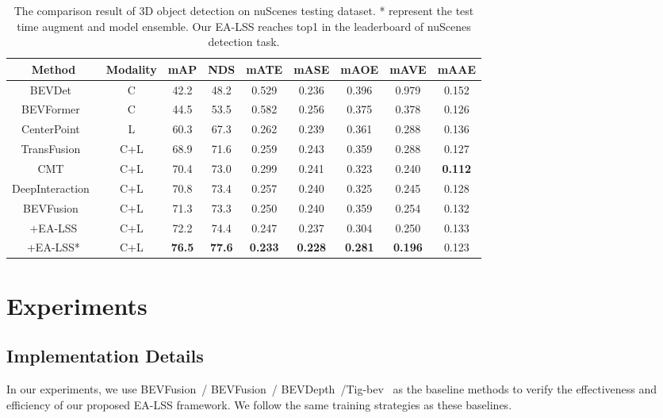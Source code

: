 \documentclass[letterpaper]{article} \usepackage[submission]{aaai24}  \usepackage{times}  \usepackage{helvet}  \usepackage{courier}  \usepackage[hyphens]{url}  \usepackage{graphicx} \urlstyle{rm} \def\UrlFont{\rm}  \usepackage{natbib}  \usepackage{caption} \frenchspacing  \setlength{\pdfpagewidth}{8.5in} \setlength{\pdfpageheight}{11in} \usepackage{algorithm}
\begin{document}
\begin{table*}
\begin{center}
\small
\begin{tabular}{c|c|cc|ccccc}
\hline
Method & Modality & mAP  & NDS & mATE & mASE & mAOE & mAVE & mAAE \\
\hline
BEVDet~\cite{huang2021bevdet} & C &  42.2  & 48.2 & 0.529&0.236&0.396&0.979&0.152  \\
BEVFormer~\cite{li2022bevformer} & C &44.5&53.5& 0.582& 0.256& 0.375& 0.378 & 0.126 \\
CenterPoint~\cite{yin2021centerpoint} & L &60.3& 67.3& 0.262 & 0.239 & 0.361 & 0.288& 0.136 \\
TransFusion~\cite{bai2022transfusion} & C+L &68.9& 71.6& 0.259 & 0.243 & 0.359 & 0.288& 0.127 \\
CMT~\cite{yan2023cmt}  & C+L &70.4& 73.0& 0.299 & 0.241 & 0.323 & 0.240& \textbf{0.112} \\
DeepInteraction~\cite{yang2022deepinteraction}  & C+L & 70.8 & 73.4 & 0.257 & 0.240 & 0.325 & 0.245 & 0.128 \\
\hline
BEVFusion~\cite{liang2022bevfusion} & C+L &	71.3  & 73.3 & 0.250& 0.240& 0.359& 0.254& 0.132 \\
+EA-LSS  & C+L & 72.2& 74.4& 0.247&0.237& 0.304& 0.250 & 0.133 \\	
+EA-LSS*  & C+L & \textbf{76.5} &  \textbf{77.6} & \textbf{0.233} & \textbf{0.228} & \textbf{0.281} & \textbf{0.196} & 0.123\\	
\hline
\end{tabular}
\end{center}
\caption{The comparison result of 3D object detection on nuScenes testing dataset. * represent the test time augment and model ensemble. Our EA-LSS reaches top1 in the leaderboard of nuScenes detection task.}
\label{table:detection_test}
\end{table*}



\section{Experiments}
\subsection{Implementation Details}
In our experiments, we use BEVFusion~\cite{liu2022bevfusion}/ BEVFusion~\cite{liang2022bevfusion}/ BEVDepth~\cite{li2022bevdepth}/Tig-bev~\cite{huang2022tigbev} as the baseline methods to verify the effectiveness and efficiency of our proposed EA-LSS framework. We follow the same training strategies as these baselines.
\end{document}

